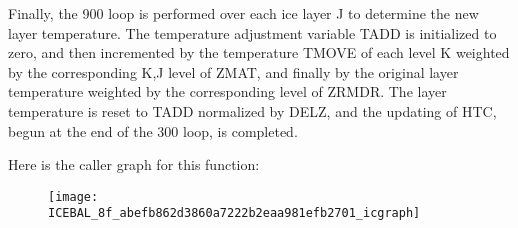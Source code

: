 Finally, the 900 loop is performed over each ice layer J to determine the new layer temperature. The temperature adjustment variable T\+A\+D\+D is initialized to zero, and then incremented by the temperature T\+M\+O\+V\+E of each level K weighted by the corresponding K,J level of Z\+M\+A\+T, and finally by the original layer temperature weighted by the corresponding level of Z\+R\+M\+D\+R. The layer temperature is reset to T\+A\+D\+D normalized by D\+E\+L\+Z, and the updating of H\+T\+C, begun at the end of the 300 loop, is completed.

Here is the caller graph for this function\+:\nopagebreak
\begin{figure}[H]
\begin{center}
\leavevmode
\texttt{[image: ICEBAL\_8f\_abefb862d3860a7222b2eaa981efb2701\_icgraph]}
\end{center}
\end{figure}


